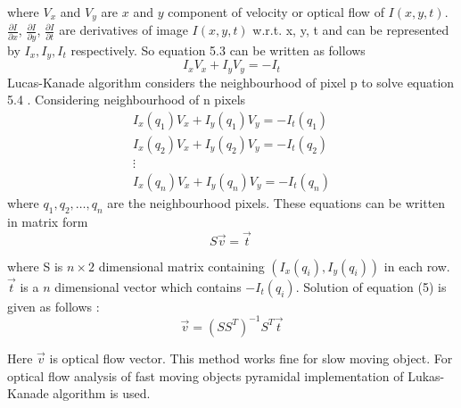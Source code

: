 where \(V_x\) and \(V_y\) are \(x\) and \(y\) component of velocity or optical flow of \(I(x,y,t)\). \( \frac{\partial I}{\partial x} \), \( \frac{\partial I}{\partial y} \), \( \frac{\partial I}{\partial t} \) are derivatives of image \(I(x,y,t)\) w.r.t. x, y, t and can be represented by \(I_x, I_y, I_t \) respectively. So equation 5.3 can be written as follows 
\begin{equation}
     I_x V_x + I_y V_y = -I_t
\end{equation}
Lucas-Kanade algorithm considers the neighbourhood of pixel p to solve equation 5.4 . Considering neighbourhood of n pixels \\
\begin{equation*}
\begin{split}
    I_{x}(q_{1})V_{x}+I_{y}(q_{1})V_{y}=-I_{t}(q_{1})
    \\
    I_{x}(q_{2})V_{x}+I_{y}(q_{2})V_{y}=-I_{t}(q_{2})
    \\
    {\displaystyle \vdots }
    \\
    I_{x}(q_{n})V_{x}+I_{y}(q_{n})V_{y}=-I_{t}(q_{n})
\end{split}
\end{equation*}
where \(q_{1},q_{2},\dots ,q_{n}\) are the neighbourhood pixels. These equations can be written in matrix form 
\begin{equation}
    S\vec v = \vec t\    
\end{equation}

where S is \(n\times2\) dimensional matrix containing \((I_{x}(q_{i}),I_{y}(q_{i}))\) in each row. \(\vec t\) is a \(n\) dimensional vector which contains \(-I_{t}(q_{i})\). Solution of equation (5) is given as follows : 
\begin{equation}
    \vec v = (SS^T)^{-1} S^T\vec{t}
\end{equation}

Here \(\vec v\) is optical flow vector. This method works fine for slow moving object. For optical flow analysis of fast moving objects pyramidal implementation of Lukas-Kanade algorithm is used.
